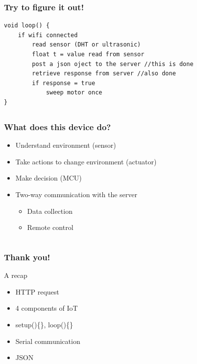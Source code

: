 \documentclass[compress, aspectratio=32]{beamer}
\begin{document}
\begin{frame}[fragile]
    \frametitle{Try to figure it out!}
    \begin{lstlisting}[numbers=none, caption={Pseudo code}]
void loop() {
    if wifi connected
        read sensor (DHT or ultrasonic)
        float t = value read from sensor
        post a json oject to the server //this is done
        retrieve response from server //also done
        if response = true
            sweep motor once
}
    \end{lstlisting}
\end{frame}

\subsection*{}
\begin{frame}
    \frametitle{What does this device do?}
    \begin{itemize}
        \item Understand environment (sensor)
        \item Take actions to change environment (actuator)
        \item Make decision (MCU)
        \item Two-way communication with the server
        \begin{itemize}
            \item Data collection
            \item Remote control
        \end{itemize}
    \end{itemize}
\end{frame}

\section*{}
\begin{frame}
    \frametitle{Thank you!}
    A recap
    \begin{itemize}
        \item HTTP request
        \item 4 components of IoT
        \item setup()\{\}, loop()\{\}
        \item Serial communication
        \item JSON 
    \end{itemize}
\end{frame}
\end{document}
